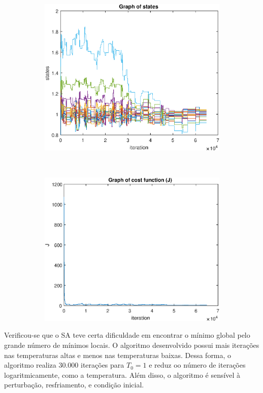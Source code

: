 \documentclass[12pt]{article}
\newenvironment{exercise}[2][Exercício]{\begin{trivlist}
\item[\hskip \labelsep {\bfseries #1}\hskip \labelsep {\bfseries #2.}]}{\end{trivlist}}
\begin{document}
\begin{exercise}{2}
\begin{figure}[H]
    \centering
    \begin{subfigure}[b]{0.45\textwidth}
        \includegraphics[width=\textwidth]{figs/ex3_states.eps}
    \end{subfigure}
    ~ 
    \begin{subfigure}[b]{0.45\textwidth}
        \includegraphics[width=\textwidth]{figs/ex3_j.eps}
    \end{subfigure}
\end{figure}

Verificou-se que o SA teve certa dificuldade em encontrar o mínimo global pelo
grande número de mínimos locais. O algoritmo desenvolvido possui mais iterações
nas temperaturas altas e menos nas temperaturas baixas. Dessa forma, o
algoritmo realiza $30.000$ iterações para $T_0=1$ e reduz oo número de
iterações logaritmicamente, como a temperatura. Além disso, o algoritmo é
sensível à perturbação, resfriamento, e condição inicial.
\end{exercise}
 
\end{document}
